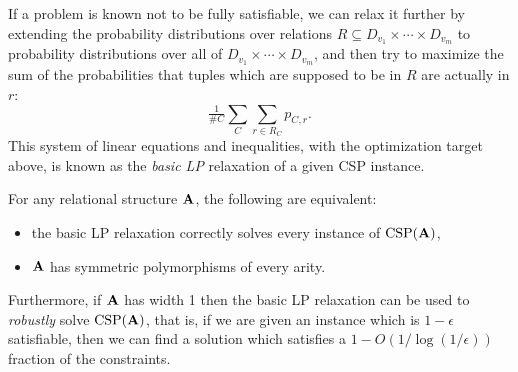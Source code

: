 \documentclass[letterpaper,11pt]{article}
\DeclareMathOperator{\CSP}{CSP}
\begin{document}
If a problem is known not to be fully satisfiable, we can relax it further by extending the probability distributions over relations $R \subseteq D_{v_1} \times \cdots \times D_{v_m}$ to probability distributions over all of $D_{v_1} \times \cdots \times D_{v_m}$, and then try to maximize the sum of the probabilities that tuples which are supposed to be in $R$ are actually in $r$:
\[
\tfrac{1}{\#C}\sum_C \sum_{r \in R_C} p_{C,r}.
\]
This system of linear equations and inequalities, with the optimization target above, is known as the \emph{basic LP} relaxation of a given CSP instance.

\begin{thm}\label{lp-robust} For any relational structure $\mathbf{A}$, the following are equivalent:
\begin{itemize}
\item the basic LP relaxation correctly solves every instance of $\CSP(\fA)$,

\item $\mathbf{A}$ has symmetric polymorphisms of every arity.
\end{itemize}
Furthermore, if $\mathbf{A}$ has width 1 then the basic LP relaxation can be used to \emph{robustly} solve $\CSP(\fA)$, that is, if we are given an instance which is $1 - \epsilon$ satisfiable, then we can find a solution which satisfies a $1 - O(1/\log(1/\epsilon))$ fraction of the constraints.
\end{thm}
\end{document}
